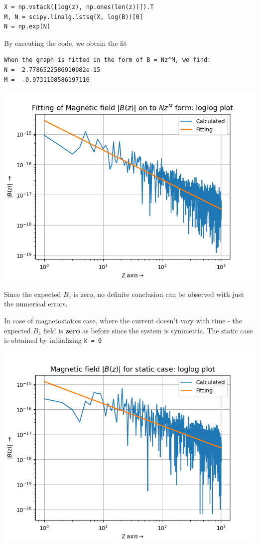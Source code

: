 \documentclass[12pt, a4paper]{report}
\begin{document}
\begin{verbatim}
X = np.vstack([log(z), np.ones(len(z))]).T
M, N = scipy.linalg.lstsq(X, log(B))[0]
N = np.exp(N)
\end{verbatim}

By executing the code, we obtain the fit
\begin{verbatim}
When the graph is fitted in the form of B = Nz^M, we find:
N =  2.7786522586910982e-15
M =  -0.9731108586197116
\end{verbatim}

\begin{center}
	\includegraphics[scale=0.8]{Figure_3.png} 
	\label{fig:rawdata}
\end{center}

Since the expected $B_z$ is zero, no definite conclusion can be observed with just the numerical errors. 

In case of magnetostatics case, where the current doesn't vary with time - the expected $B_z$ field is \textbf{zero} as before since the system is symmetric. The static case is obtained by initializing \texttt{k = 0}
\clearpage

\begin{center}
	\includegraphics[scale=0.8]{Figure_4.png} 
	\label{fig:rawdata}
\end{center}
\end{document}
